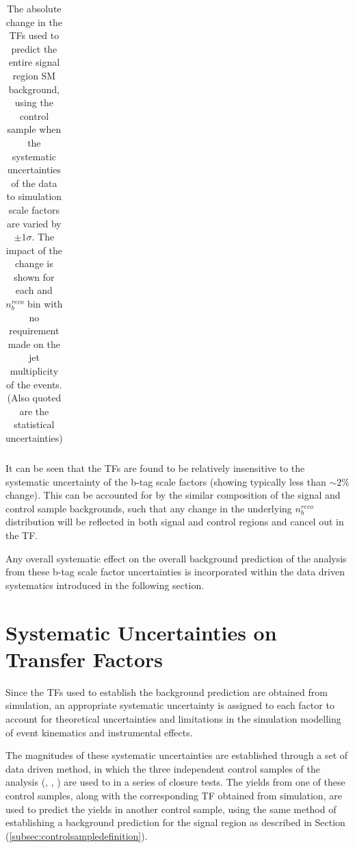 \begin{table}[ht!]
\begin{center}
\begin{tabular*}{0.95\textwidth}{@{\extracolsep{\fill}} ccccc}
\end{tabular*}
\end{center}
\caption[The absolute change in the \ac{TF}s used to predict the entire signal region \ac{SM} background, using the \mupjets control sample when the systematic uncertainties of the data to simulation scale factors are varied by $\pm 1 \sigma$.]{The absolute change in the \ac{TF}s used to predict the entire signal region \ac{SM} background, using the \mupjets control sample when the systematic uncertainties of the data to simulation scale factors are varied by $\pm 1 \sigma$. The impact of the change is shown for each \theht and $n_{b}^{reco}$ bin with no requirement made on the jet multiplicity of the events. (Also quoted are the statistical uncertainties)}\label{tab:btagsfuncertainties}
\end{table}
\def\arraystretch{1.0}

It can be seen that the \ac{TF}s are found to be relatively insensitive to the systematic uncertainty of the b-tag scale factors (showing typically less than $\sim2\%$ change). This can be accounted for by the similar composition of the signal and control sample backgrounds, such that any change in the underlying $n_{b}^{reco}$ distribution will be reflected in both signal and control regions and cancel out in the \ac{TF}. 

Any overall systematic effect on the overall background prediction of the analysis from these b-tag scale factor uncertainties is incorporated within the data driven systematics introduced in the following section.

\section{Systematic Uncertainties on Transfer Factors}
\label{subsec:sysuncertainties}

Since the \ac{TF}s used to establish the background prediction are obtained from simulation, an appropriate systematic uncertainty is assigned to each factor to account for theoretical uncertainties \cite{Bern:2011pa} and limitations in the simulation modelling of event kinematics and instrumental effects. 

The magnitudes of these systematic uncertainties are established through a set of data driven method, in which the three independent control samples of the analysis (\mupjets, \dimupjets, \gpjets) are used to in a series of closure tests. The yields from one of these control samples, along with the corresponding \ac{TF} obtained from simulation, are used to predict the yields in another control sample, using the same method of establishing a background prediction for the signal region as described in Section (\ref{subsec:controlsampledefinition}).

